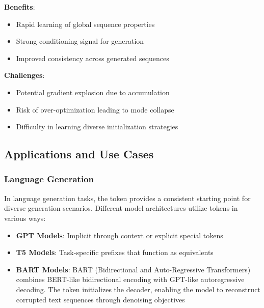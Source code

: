 \textbf{Benefits}:
\begin{itemize}
\item Rapid learning of global sequence properties
\item Strong conditioning signal for generation
\item Improved consistency across generated sequences
\end{itemize}

\textbf{Challenges}:
\begin{itemize}
\item Potential gradient explosion due to accumulation
\item Risk of over-optimization leading to mode collapse
\item Difficulty in learning diverse initialization strategies
\end{itemize}

\subsection{Applications and Use Cases}

\subsubsection{Language Generation}

In language generation tasks, the \sos{} token provides a consistent starting point for diverse generation scenarios. Different model architectures utilize \sos{} tokens in various ways:

\begin{itemize}
\item \textbf{GPT Models}: Implicit \sos{} through context or explicit special tokens
\item \textbf{T5 Models}: Task-specific prefixes that function as \sos{} equivalents
\item \textbf{BART Models}: BART (Bidirectional and Auto-Regressive Transformers) \citep{lewis2020bart} combines BERT-like bidirectional encoding with GPT-like autoregressive decoding. The \sos{} token initializes the decoder, enabling the model to reconstruct corrupted text sequences through denoising objectives
\end{itemize}

